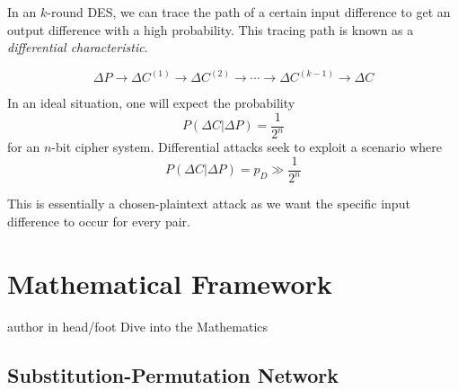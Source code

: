 \documentclass[9pt]{beamer}
\begin{document}
\begin{frame}
In an $k$-round DES, we can trace the path of a certain input difference to get an output difference with a high probability. This tracing path is known as a {\it differential characteristic}.

\[ \Delta P \rightarrow \Delta C^{(1)} \rightarrow \Delta C^{(2)} \rightarrow \cdots \rightarrow \Delta C^{(k-1)} \rightarrow \Delta C \]

In an ideal situation, one will expect the probability
\[ P \left(\Delta C | \Delta P \right) = \frac{1}{2^n} \]
for an $n$-bit cipher system. Differential attacks seek to exploit a scenario where
\[ P \left(\Delta C | \Delta P \right) = p_D \gg \frac{1}{2^n} \]

This is essentially a chosen-plaintext attack as we want the specific input difference to occur for every pair.
\end{frame}

\section{Mathematical Framework}
\begin{frame}
\begin{beamercolorbox}[ht=2.5ex,dp=1.125ex,center,rounded=true,shadow=true]{author in head/foot}
Dive into the Mathematics
\end{beamercolorbox}
\end{frame}

\subsection{Substitution-Permutation Network}
\end{document}
